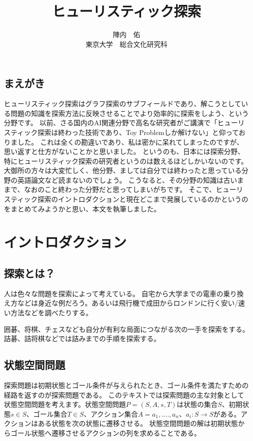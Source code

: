 \documentclass{book}
\title{ヒューリスティック探索}
\author{陣内　佑 \\
東京大学　総合文化研究科}
\begin{document}
\maketitle

\tableofcontents
\newpage

\section*{まえがき}
ヒューリスティック探索はグラフ探索のサブフィールドであり、解こうとしている問題の知識を探索方法に反映させることでより効率的に探索をしよう、という分野です。
以前、さる国内のAI関連分野で高名な研究者がご講演で「ヒューリスティック探索は終わった技術であり、Toy Problemしか解けない」と仰っておりました。
これは全くの勘違いであり、私は密かに呆れてしまったのですが、思い返すと仕方がないことかと思いました。
というのも、日本には探索分野、特にヒューリスティック探索の研究者というのは数えるほどしかいないのです。
大御所の方々は大変忙しく、他分野、ましては自分では終わったと思っている分野の英語論文など読まないのでしょう。
こうなると、その分野の知識は古いままで、なおのこと終わった分野だと思ってしまいがちです。
そこで、ヒューリスティック探索のイントロダクションと現在どこまで発展しているのかというのをまとめてみようかと思い、本文を執筆しました。


\chapter{イントロダクション}
\section{探索とは？}

人は色々な問題を探索によって考えている。
自宅から大学までの電車の乗り換え方などは身近な例だろう。あるいは飛行機で成田からロンドンに行く安い/速い方法などを調べたりする。

囲碁、将棋、チェスなども自分が有利な局面につながる次の一手を探索をする。
詰碁、詰将棋などでは詰みまでの手順を探索する。



\section{状態空間問題}
探索問題は初期状態とゴール条件が与えられたとき、ゴール条件を満たすための経路を返すのが探索問題である。
このテキストでは探索問題の主な対象として状態空間問題を考えます。状態空間問題$P = (S, A, s, T)$は状態の集合$S$、初期状態$s \in S$、ゴール集合$T \in S$、アクション集合$A = {a_1, ....,a_n}$、$a_i : S \rightarrow S$がある。アクションはある状態を次の状態に遷移させる。
状態空間問題の解は初期状態からゴール状態へ遷移させるアクションの列を求めることである。
\end{document}
